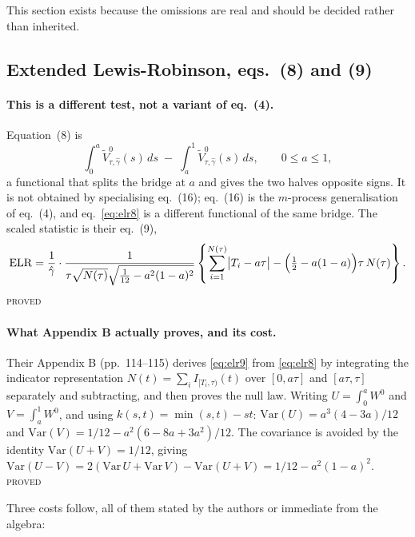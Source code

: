 \documentclass[11pt,a4paper]{article}
\newcommand{\Vtilde}{\widetilde{V}^{0}_{\tau,\hat\gamma}}
\newcommand{\Wbridge}{W^{0}}
\newcommand{\gh}{\hat\gamma}
\newcommand{\Ntau}{N(\tau)}
\newcommand{\PROVED}{\textsc{\textcolor{blue!55!black}{proved}}}
\begin{document}
This section exists because the omissions are real and should be decided rather than
inherited.

\subsection{Extended Lewis-Robinson, eqs.~(8) and (9)}

\paragraph{This is a different test, not a variant of eq.~(4).} Equation~(8) is
%
\begin{equation}
\int_0^a \Vtilde(s)\,ds \;-\; \int_a^1 \Vtilde(s)\,ds ,
\qquad 0 \le a \le 1,
\label{eq:elr8}
\end{equation}
%
a functional that splits the bridge at $a$ and gives the two halves opposite signs. It
is not obtained by specialising eq.~(16); eq.~(16) is the $m$-process generalisation of
eq.~(4), and eq.~\eqref{eq:elr8} is a different functional of the same bridge. The
scaled statistic is their eq.~(9),
%
\begin{equation}
\mathrm{ELR} = \frac{1}{\gh}\cdot
\frac{1}{\tau\sqrt{\Ntau}\sqrt{\tfrac{1}{12} - a^2(1-a)^2}}
\left\{\sum_{i=1}^{\Ntau}\bigl|T_i - a\tau\bigr|
- \Bigl(\tfrac{1}{2} - a(1-a)\Bigr)\tau\,\Ntau\right\}.
\label{eq:elr9}
\end{equation}
\PROVED

\paragraph{What Appendix B actually proves, and its cost.}
Their Appendix B (pp.~114--115) derives \eqref{eq:elr9} from \eqref{eq:elr8} by
integrating the indicator
representation $N(t) = \sum_i I_{[T_i,\tau)}(t)$ over $[0,a\tau]$ and $[a\tau,\tau]$
separately and subtracting, and then proves the null law. Writing
$U = \int_0^a \Wbridge$ and $V = \int_a^1 \Wbridge$, and using
$k(s,t) = \min(s,t) - st$:
$\mathrm{Var}(U) = a^3(4-3a)/12$ and
$\mathrm{Var}(V) = 1/12 - a^2(6-8a+3a^2)/12$. The covariance is avoided by the identity
$\mathrm{Var}(U+V) = 1/12$, giving
$\mathrm{Var}(U-V) = 2(\mathrm{Var}\,U + \mathrm{Var}\,V) - \mathrm{Var}(U+V)
= 1/12 - a^2(1-a)^2$. \PROVED

Three costs follow, all of them stated by the authors or immediate from the algebra:
\end{document}
